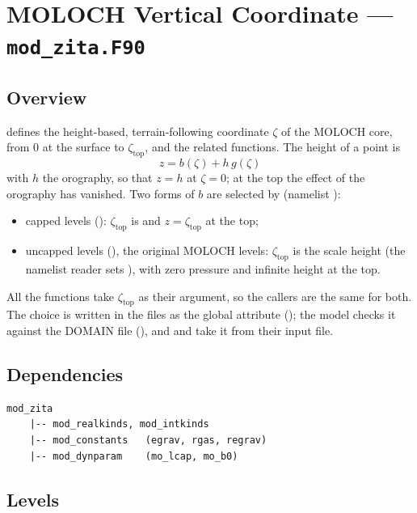 \section{MOLOCH Vertical Coordinate --- \texttt{mod\_zita.F90}}
\label{sec:zita}

\subsection{Overview}

 defines the height-based, terrain-following coordinate
$\zeta$ of the MOLOCH core, from 0 at the surface to $\zeta_\text{top}$,
and the related functions. The height of a point is
\[
  z = b(\zeta) + h\,g(\zeta)
\]
with $h$ the orography, so that $z = h$ at $\zeta = 0$; at the top the
effect of the orography has vanished. Two forms of $b$ are selected by
 (namelist ):
\begin{itemize}
  \item capped levels (): $\zeta_\text{top}$ is
     and $z = \zeta_\text{top}$ at the top;
  \item uncapped levels (), the original MOLOCH
    levels: $\zeta_\text{top}$ is the scale height  (the
    namelist reader sets ), with zero pressure and
    infinite height at the top.
\end{itemize}
All the functions take $\zeta_\text{top}$ as their  argument,
so the callers are the same for both. The choice is written in the files
as the global attribute  (); the
model checks it against the DOMAIN file (), and
 and  take it from their input file.

\subsection{Dependencies}

\begin{lstlisting}
mod_zita
    |-- mod_realkinds, mod_intkinds
    |-- mod_constants   (egrav, rgas, regrav)
    |-- mod_dynparam    (mo_lcap, mo_b0)
\end{lstlisting}

\subsection{Levels}

